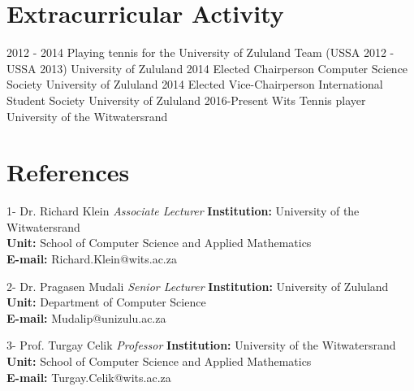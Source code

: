 \documentclass[letterpaper]{moderncv}        %
\begin{document}
\section{Extracurricular Activity}
\cventry
{2012 - 2014}
{Playing tennis for the University of Zululand Team (USSA 2012 - USSA 2013)}
{University of Zululand}
{}
{\textit{}}
{}
\cventry
{2014}
{Elected Chairperson Computer Science Society}
{University of Zululand}
{}
{\textit{}}
{}
\cventry
{2014}
{Elected Vice-Chairperson International Student Society}
{University of Zululand}
{}
{\textit{}}
{}	
\cventry
{2016-Present}
{Wits Tennis player}
{University of the Witwatersrand}
{}
{\textit{}}
{}

\section{References}
\cventry
{1-}
{Dr. Richard Klein}
{}
{\textit{Associate Lecturer}}
{}
{\textbf{Institution:} University of the Witwatersrand\\
	\textbf{Unit:} School of Computer Science and Applied Mathematics\\
	\textbf{E-mail:} Richard.Klein@wits.ac.za}
\vspace{1mm}

\cventry
{2-}
{Dr. Pragasen Mudali}
{}
{\textit{Senior Lecturer}}
{}
{\textbf{Institution:} University of Zululand\\
	\textbf{Unit:} Department of Computer Science\\
	\textbf{E-mail:} Mudalip@unizulu.ac.za}
\vspace{1mm}

\cventry
{3-}
{Prof. Turgay Celik}
{}
{\textit{Professor}}
{}
{\textbf{Institution:} University of the Witwatersrand\\
	\textbf{Unit:} School of Computer Science and Applied Mathematics\\
	\textbf{E-mail:} Turgay.Celik@wits.ac.za}
\vspace{1mm}
\end{document}
